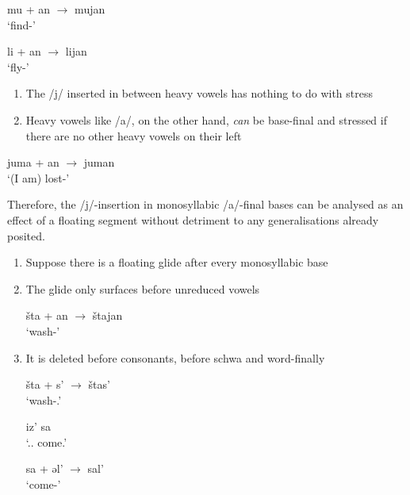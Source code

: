 \documentclass[a4paper, 12pt]{article}
\begin{document}
\begin{minipage}[t]{.45\linewidth}
\ex\label{ex:mu1}
	mu + an $\rightarrow$ mujan \\`find-{\Fsg}' 
\xe
\end{minipage}
\hfill
\begin{minipage}[t]{.45\linewidth}
\ex\label{ex:li1}
	li + an $\rightarrow$ lijan \\`fly-{\Fsg}' 
\xe
\end{minipage}	
	
	\begin{enumerate}[$\gg$]
		\item The /j/ inserted in between heavy vowels has nothing to do with stress
		\item Heavy vowels like /a/, on the other hand, \emph{can} be base-final and stressed if there are no other heavy vowels on their left
	\end{enumerate}
	
\ex\label{ex:juma}
	juma + an $\rightarrow$ juman \\`(I am) lost-{\Fsg}' 
\xe

	\noindent Therefore, the /j/-insertion in monosyllabic /a/-final bases can be analysed as an effect of a floating segment without detriment to any generalisations already posited. 
	
	\begin{enumerate}[$\gg$]
		\item Suppose there is a floating glide after every monosyllabic base
		\item The glide only surfaces before unreduced vowels
		
\ex\label{ex:shtajan}
	šta + an $\rightarrow$ štajan \\`wash-{\Fsg}' 
\xe
		
		\item It is deleted before consonants, before schwa and word-finally
		
\begin{minipage}[t]{.3\linewidth}
\ex\label{ex:shtas}
	šta + s' $\rightarrow$ štas' \\`wash-{\Pst}.{\Tsg}' 
\xe
\end{minipage}
\hfill
\begin{minipage}[t]{.34\linewidth}
\ex\label{ex:izsa}
	iz' sa \\`{\Neg}.{\Pst}.{\Tsg} come.{\Cn}'
\xe
\end{minipage}	
\hfill
\begin{minipage}[t]{.3\linewidth}
\ex\label{ex:sal}
	sa + əl' $\rightarrow$ sal' \\`come-{\Ipf}'
\xe
\end{minipage}

	\end{enumerate}	
	
\end{document}
